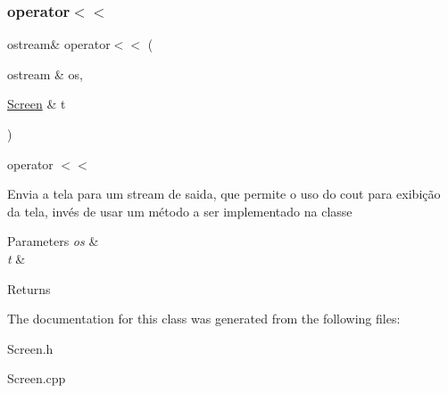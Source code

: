 \subsubsection{\texorpdfstring{operator$<$$<$}{operator<<}}
{\footnotesize\ttfamily ostream\& operator$<$$<$ (\begin{DoxyParamCaption}\item[{ostream \&}]{os,  }\item[{\hyperlink{classScreen}{Screen} \&}]{t }\end{DoxyParamCaption})\hspace{0.3cm}{\ttfamily [friend]}}



operator $<$$<$ 

Envia a tela para um stream de saida, que permite o uso do cout para exibição da tela, invés de usar um método a ser implementado na classe


\begin{DoxyParams}{Parameters}
{\em os} & \\
\hline
{\em t} & \\
\hline
\end{DoxyParams}
\begin{DoxyReturn}{Returns}

\end{DoxyReturn}


The documentation for this class was generated from the following files\+:\begin{DoxyCompactItemize}
\item 
Screen.\+h\item 
Screen.\+cpp\end{DoxyCompactItemize}
